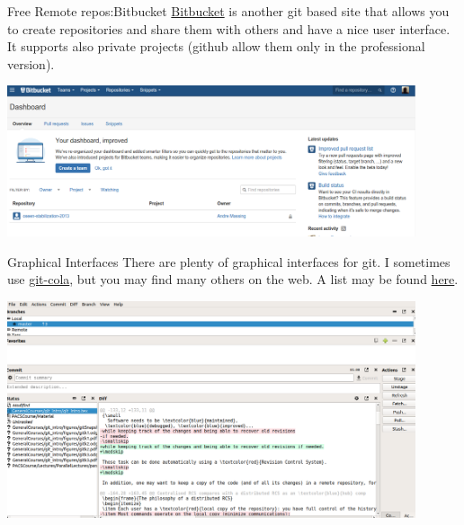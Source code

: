 \documentclass[hyperref={colorlinks}]{beamer}
\begin{document}
\begin{frame}{Free Remote repos:Bitbucket}
\href{https://bitbucket.org/}{Bitbucket} is another git based site that allows you to create repositories and share them with others and have a nice user interface. It supports also private projects (github allow them only in the professional version).
\medskip

\centerline{
\includegraphics[width=0.9\textwidth]{figures/bitbucket}
}
\end{frame}

\begin{frame}{Graphical Interfaces}
There are plenty of graphical interfaces for git. I sometimes use \href{https://git-cola.github.io/}{git-cola}, but you may find many others on the web.
A list may be found \href{https://git-scm.com/download/gui/linux}{here}.

\medskip

\centerline{
\includegraphics[width=0.9\textwidth]{figures/gitcola}
}

\end{frame}
%
%
\end{document}
